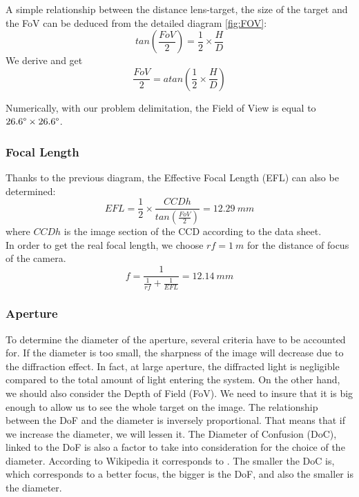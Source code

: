 A simple relationship between the distance lens-target, the size of the target and the FoV can be deduced from the detailed diagram \ref{fig:FOV}: 
\begin{equation*}
tan( \frac{FoV}{2}) = \frac{1}{2} \times \frac{H}{D}
\end{equation*}
We derive and get
\begin{equation*}
 \frac{FoV}{2} = atan(\frac{1}{2} \times \frac{H}{D})
\end{equation*}

Numerically, with our problem delimitation, the Field of View is equal to $26.6\degree \times 26.6\degree$. 

\subsubsection{Focal Length}
\label{focalLength}
Thanks to the previous diagram, the Effective Focal Length (EFL) can also be determined: 
\begin{equation*}
EFL = \frac{1}{2} \times \frac{CCDh}{tan(\frac{FoV}{2})} = 12.29 \ mm
\end{equation*}
where $CCDh$ is the image section of the CCD according to the data sheet.\\

In order to get the real focal length, we choose $rf = 1 \ m$ for the distance of focus of the camera. 
\begin{equation*}
f = \frac{1}{\frac{1}{rf}+\frac{1}{EFL}} = 12.14 \ mm
\end{equation*}

\subsubsection{Aperture}
\label{aperture}
To determine the diameter of the aperture, several criteria have to be accounted for. If the diameter is too small, the sharpness of the image will decrease due to the diffraction effect. In fact, at large aperture, the diffracted light is negligible compared to the total amount of light entering the system. On the other hand, we should also consider the Depth of Field (FoV). We need to insure that it is big enough to allow us to see the whole target on the image. The relationship between the DoF and the diameter is inversely proportional. That means that if we increase the diameter, we will lessen it. The Diameter of Confusion (DoC), linked to the DoF is also a factor to take into consideration for the choice of the diameter. According to Wikipedia \cite{wiki:coc} it corresponds to . The smaller the DoC is, which corresponds to a better focus, the bigger is the DoF, and also the smaller is the diameter.

